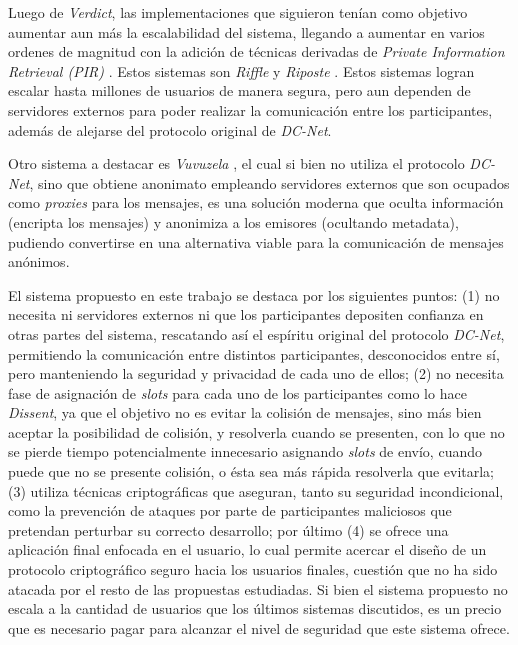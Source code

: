 Luego de \emph{Verdict}, las implementaciones que siguieron tenían como objetivo 
aumentar aun más la escalabilidad del sistema, llegando a aumentar en varios ordenes de magnitud 
con la adición de técnicas derivadas de \emph{Private Information Retrieval (PIR)} 
\cite{chor1995private}. Estos sistemas son \emph{Riffle} \cite{kwon2016riffle} y 
\emph{Riposte} \cite{corrigan2015riposte}. Estos sistemas logran escalar hasta 
millones de usuarios de manera segura, pero aun dependen de servidores externos 
para poder realizar la comunicación entre los participantes, además de alejarse del 
protocolo original de \emph{DC-Net}.

Otro sistema a destacar es \emph{Vuvuzela} \cite{van2015vuvuzela}, el cual si bien no 
utiliza el protocolo \emph{DC-Net}, sino que obtiene anonimato empleando 
servidores externos que son ocupados como \emph{proxies} para los mensajes, es una 
solución moderna que oculta información (encripta los mensajes) y anonimiza a los 
emisores (ocultando metadata), pudiendo convertirse en una alternativa viable 
para la comunicación de mensajes anónimos.

El sistema propuesto en este trabajo se destaca por los siguientes puntos: (1) no necesita 
ni servidores externos ni que los participantes depositen confianza en otras partes del sistema, 
rescatando así el espíritu original del protocolo \emph{DC-Net}, permitiendo la comunicación 
entre distintos participantes, desconocidos entre sí, pero manteniendo la seguridad y privacidad 
de cada uno de ellos; (2) no necesita fase de asignación de \emph{slots} para cada uno 
de los participantes como lo hace \emph{Dissent}, ya que el objetivo no es evitar la 
colisión de mensajes, sino más bien aceptar la posibilidad de colisión, y resolverla 
cuando se presenten, con lo que no se pierde tiempo potencialmente innecesario asignando 
\emph{slots} de envío, cuando puede que no se presente colisión, o ésta sea más rápida 
resolverla que evitarla; (3) utiliza técnicas criptográficas que aseguran, tanto su seguridad 
incondicional, como la prevención de ataques por parte de participantes maliciosos 
que pretendan perturbar su correcto desarrollo; por último (4) se ofrece una aplicación 
final enfocada en el usuario, lo cual permite acercar el diseño de un protocolo criptográfico 
seguro hacia los usuarios finales, cuestión que no ha sido atacada por el resto de las propuestas 
estudiadas. Si bien el sistema propuesto no 
escala a la cantidad de usuarios que los últimos sistemas discutidos, es un precio 
que es necesario pagar para alcanzar el nivel de seguridad que este sistema ofrece.
